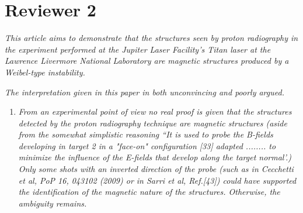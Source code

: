 \documentclass{article}
\begin{document}
\section{Reviewer 2}

\textit{This article aims to demonstrate that the structures seen by proton radiography in the experiment performed at the Jupiter Laser Facility's Titan laser at the Lawrence Livermore National Laboratory are magnetic structures produced by a Weibel-type instability.}

\textit{
The interpretation given in this paper in both unconvincing and poorly argued.}
\begin{enumerate}
\item \textit{From an experimental point of view no real proof is given that the structures detected by the proton radiography technique are magnetic structures (aside from the somewhat simplistic reasoning ``It is used to probe the B-fields developing in target 2 in a "face-on" configuration [33] adapted ........ to minimize the influence of the E-fields that develop along the target normal'.)
Only some shots with an inverted direction of the probe (such as in Cecchetti et al, PoP 16, 043102 (2009) or in Sarri et al, Ref.[43]) could have supported the identification of the magnetic nature of the structures. Otherwise, the ambiguity remains. }



\end{enumerate}
\end{document}
